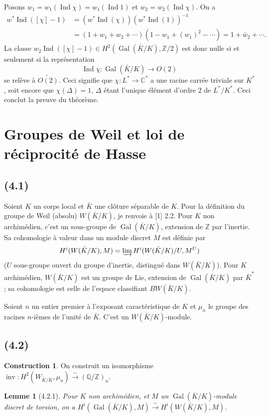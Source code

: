\documentclass[11pt]{amsart}
\theoremstyle{plain}
\newtheorem{lemme}[theoreme]{Lemme}
\theoremstyle{definition}
\newtheorem{construction}[theoreme]{Construction}
\DeclareMathOperator{\Gal}{Gal}
\DeclareMathOperator{\Ind}{Ind}
\DeclareMathOperator{\inv}{inv}
\newcommand{\C}{\mathbb{C}}
\newcommand{\Z}{\mathbb{Z}}
\newcommand{\Q}{\mathbb{Q}}
\begin{document}
Posons $w_1=w_1(\Ind\chi)=w_1(\Ind 1)$ et $w_2=w_2(\Ind\chi)$. On a
\begin{align*}
w^*\Ind([\chi]-1)&=(w^*\Ind(\chi))(w^*\Ind(1))^{-1} \\
&=(1+w_1+w_2+\cdots)(1-w_1+(w_1)^2-\cdots)=1+\bar{w}_2+\cdots.
\end{align*}
La classe $w_2\Ind([\chi]-1)\in H^2(\Gal(\bar K/K),\Z/2)$ est donc nulle si et seulement si la repr\'esentation
\[
\Ind\chi\colon\Gal(\bar K/K)\longrightarrow O(2)
\]
se rel\`eve \`a $\widetilde{O(2)}$. Ceci signifie que $\chi\colon L^*\to\C^*$ a une racine carr\'ee triviale sur $K^*$, soit encore que $\chi(\Delta)=1$, $\Delta$ \'etant l'unique \'el\'ement d'ordre $2$ de $L^*/K^*$. Ceci conclut la preuve du th\'eor\`eme.

\section{Groupes de Weil et loi de r\'eciprocit\'e de Hasse}

\subsection{(4.1)}
Soient $K$ un corps local et $\bar K$ une cl\^oture s\'eparable de $K$. Pour la d\'efinition du groupe de Weil (absolu) $W(\bar K/K)$, je renvoie \`a [1] 2.2. Pour $K$ non archim\'edien, c'est un sous-groupe de $\Gal(\bar K/K)$, extension de $\Z$ par l'inertie. Sa cohomologie \`a valeur dans un module discret $M$ est d\'efinie par
\[
H^i(W(\bar K/K),M)=\varinjlim H^i(W(\bar K/K)/U,M^U)
\]
($U$ sous-groupe ouvert du groupe d'inertie, distingu\'e dans $W(\bar K/K)$). Pour $K$ archim\'edien, $W(\bar K/K)$ est un groupe de Lie, extension de $\Gal(\bar K/K)$ par $\bar K^*$; sa cohomologie est celle de l'espace classifiant $BW(\bar K/K)$.

Soient $n$ un entier premier \`a l'exposant caract\'eristique de $K$ et $\mu_n$ le groupe des racines $n$-i\`emes de l'unit\'e de $\bar K$. C'est un $W(\bar K/K)$-module.

\subsection{(4.2)}
\begin{construction}
On construit un isomorphisme $\inv\colon H^2(W_{\bar K/K},\mu_n)\xrightarrow{\sim}(\Q/\Z)_n$.
\end{construction}

\begin{lemme}[4.2.1]\label{lem:4.2.1}
Pour $K$ non archim\'edien, et $M$ un $\Gal(\bar K/K)$-module discret de torsion, on a $H^i(\Gal(\bar K/K),M)\xrightarrow{\sim}H^i(W(\bar K/K),M)$.
\end{lemme}
\end{document}
